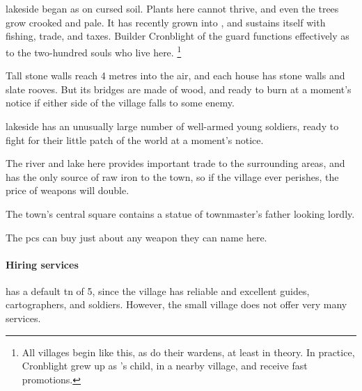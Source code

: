 

\section[\Glsfmttext{lakeside}]{~~}
\label{lakeside}

\begin{multicols}{2}

\begin{exampletext}
  \Gls{lakeside} began as  on cursed soil.
  Plants here cannot thrive, and even the trees grow crooked and pale.
  It has recently grown into , and sustains itself with fishing, trade, and taxes.
  Builder Cronblight of the \gls{guard} functions effectively as  to the two-hundred souls who live here.%
  \footnote{All \glspl{village} begin like this, as do their \glspl{warden}, at least in theory.
  In practice, Cronblight grew up as 's child, in a nearby \gls{village}, and receive fast promotions.}
\end{exampletext}

Tall stone walls reach 4 metres into the air, and each house has stone walls and slate rooves.
But its bridges are made of wood, and ready to burn at a moment's notice if either side of the \gls{village} falls to some enemy.

\Gls{lakeside} has an unusually large number of well-armed young soldiers, ready to fight for their little patch of the world at a moment's notice.

The river and lake here provides important trade to the surrounding areas, and has the only source of raw iron to the town, so if the \gls{village} ever perishes, the price of weapons will double.


The town's central square contains a statue of \gls{townmaster}'s father looking lordly.


The \glspl{pc} can buy just about any weapon they can name here.

\paragraph{Hiring services}
has a default \gls{tn} of 5, since the \gls{village} has reliable and excellent guides, cartographers, and soldiers.
However, the small \gls{village} does not offer very many services.


\end{multicols}

